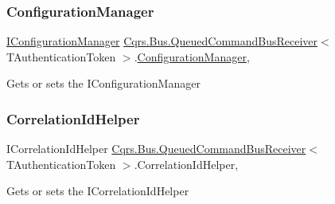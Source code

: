 \subsubsection{\texorpdfstring{Configuration\+Manager}{ConfigurationManager}}
{\footnotesize\ttfamily \hyperlink{interfaceCqrs_1_1Configuration_1_1IConfigurationManager}{I\+Configuration\+Manager} \hyperlink{classCqrs_1_1Bus_1_1QueuedCommandBusReceiver}{Cqrs.\+Bus.\+Queued\+Command\+Bus\+Receiver}$<$ T\+Authentication\+Token $>$.\hyperlink{classCqrs_1_1Configuration_1_1ConfigurationManager}{Configuration\+Manager}\hspace{0.3cm}{\ttfamily [get]}, {\ttfamily [protected]}}



Gets or sets the I\+Configuration\+Manager 

\mbox{\label{classCqrs_1_1Bus_1_1QueuedCommandBusReceiver_a4cf8781cab9cb844892eb032cfca773f_a4cf8781cab9cb844892eb032cfca773f}} 
\subsubsection{\texorpdfstring{Correlation\+Id\+Helper}{CorrelationIdHelper}}
{\footnotesize\ttfamily I\+Correlation\+Id\+Helper \hyperlink{classCqrs_1_1Bus_1_1QueuedCommandBusReceiver}{Cqrs.\+Bus.\+Queued\+Command\+Bus\+Receiver}$<$ T\+Authentication\+Token $>$.Correlation\+Id\+Helper\hspace{0.3cm}{\ttfamily [get]}, {\ttfamily [protected]}}



Gets or sets the I\+Correlation\+Id\+Helper 

\mbox{\label{classCqrs_1_1Bus_1_1QueuedCommandBusReceiver_a0d0174c10f6cde11cd5a9d76092f3058_a0d0174c10f6cde11cd5a9d76092f3058}} 
